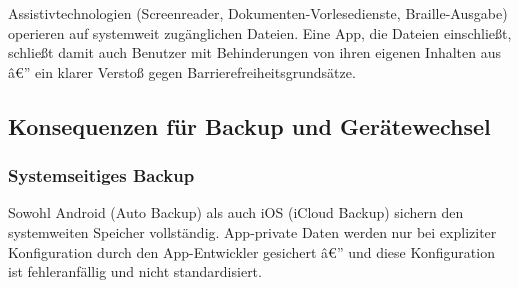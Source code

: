 ﻿\documentclass[12pt, a4paper]{article}
\begin{document}
Assistivtechnologien (Screenreader, Dokumenten-Vorlesedienste, Braille-Ausgabe)
operieren auf systemweit zugänglichen Dateien. Eine App, die Dateien einschließt,
schließt damit auch Benutzer mit Behinderungen von ihren eigenen Inhalten aus â€”
ein klarer Verstoß gegen Barrierefreiheitsgrundsätze.

\subsection{Konsequenzen für Backup und Gerätewechsel}

\subsubsection{Systemseitiges Backup}

Sowohl Android (Auto Backup) als auch iOS (iCloud Backup) sichern den systemweiten
Speicher vollständig. App-private Daten werden nur bei expliziter Konfiguration
durch den App-Entwickler gesichert â€” und diese Konfiguration ist fehleranfällig
und nicht standardisiert.
\end{document}
